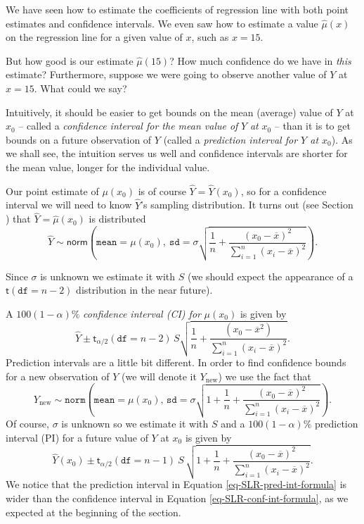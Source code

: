 \documentclass[captions=tableheading]{scrbook}
\begin{document}
We have seen how to estimate the coefficients of regression line with both point estimates and confidence intervals. We even saw how to estimate a value \(\hat{\mu}(x)\) on the regression line for a given value of \(x\), such as \(x=15\). 

But how good is our estimate \(\hat{\mu}(15)\)? How much confidence do we have in \emph{this} estimate? Furthermore, suppose we were going to observe another value of \(Y\) at \(x=15\). What could we say?

Intuitively, it should be easier to get bounds on the mean (average) value of \(Y\) at \(x_{0}\) -- called a \emph{confidence interval for the mean value of} \(Y\) \emph{at} \(x_{0}\) -- than it is to get bounds on a future observation of \(Y\) (called a \emph{prediction interval for \(Y\) at \(x_{0}\)}). As we shall see, the intuition serves us well and confidence intervals are shorter for the mean value, longer for the individual value.

Our point estimate of \(\mu(x_{0})\) is of course \(\hat{Y}=\hat{Y}(x_{0})\), so for a confidence interval we will need to know \(\hat{Y}\)'s sampling distribution. It turns out (see Section ) that \(\hat{Y}=\hat{\mu}(x_{0})\) is distributed
\begin{equation}
\hat{Y}\sim\mathsf{norm}\left(\mathtt{mean}=\mu(x_{0}),\:\mathtt{sd}=\sigma\sqrt{\frac{1}{n}+\frac{(x_{0}-\overline{x})^{2}}{\sum_{i=1}^{n}(x_{i}-\overline{x})^{2}}}\right).
\end{equation}

Since \(\sigma\) is unknown we estimate it with \(S\) (we should expect the appearance of a \(\mathsf{t}(\mathtt{df}=n-2)\) distribution in the near future). 

A \( 100(1-\alpha)\% \) \emph{confidence interval (CI) for} \(\mu(x_{0})\) is given by
\begin{equation}
\hat{Y}\pm\mathsf{t}_{\alpha/2}(\mathtt{df}=n-2)\, S\sqrt{\frac{1}{n}+\frac{(x_{0}-\overline{x}^{2})}{\sum_{i=1}^{n}(x_{i}-\overline{x})^{2}}}.\label{eq-SLR-conf-int-formula}
\end{equation}
Prediction intervals are a little bit different. In order to find confidence bounds for a new observation of \(Y\) (we will denote it \(Y_{\mbox{new}}\)) we use the fact that
\begin{equation}
Y_{\mbox{new}}\sim\mathtt{norm}\left(\mathtt{mean}=\mu(x_{0}),\,\mathtt{sd}=\sigma\sqrt{1+\frac{1}{n}+\frac{(x_{0}-\overline{x})^{2}}{\sum_{i=1}^{n}(x_{i}-\overline{x})^{2}}}\right).
\end{equation}
Of course, \(\sigma\) is unknown so we estimate it with \(S\) and a \( 100(1-\alpha)\% \) prediction interval (PI) for a future value of \(Y\) at \(x_{0}\) is given by 
\begin{equation}
\hat{Y}(x_{0})\pm\mathsf{t}_{\alpha/2}(\mathtt{df}=n-1)\: S\,\sqrt{1+\frac{1}{n}+\frac{(x_{0}-\overline{x})^{2}}{\sum_{i=1}^{n}(x_{i}-\overline{x})^{2}}}.\label{eq-SLR-pred-int-formula}
\end{equation}
We notice that the prediction interval in Equation \ref{eq-SLR-pred-int-formula} is wider than the confidence interval in Equation \ref{eq-SLR-conf-int-formula}, as we expected at the beginning of the section.
\end{document}
